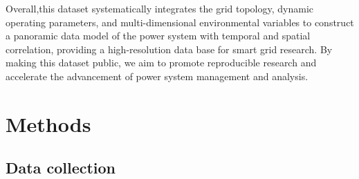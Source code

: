 \documentclass[12pt]{article}
\begin{document}



Overall,this dataset systematically integrates the grid topology, dynamic operating parameters, and multi-dimensional environmental variables to construct a panoramic data model of the power system with temporal and spatial correlation, providing a high-resolution data base for smart grid research. By making this dataset public, we aim to promote reproducible research and accelerate the advancement of power system management and analysis.

\section*{Methods}
\subsection*{Data collection}
\end{document}
